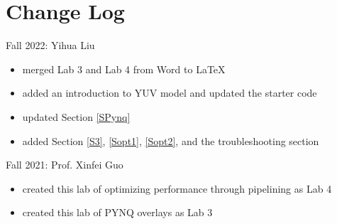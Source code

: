 \documentclass[a4paper,12pt,twoside]{article}
\begin{document}
\section{Change Log}
Fall 2022: Yihua Liu
\begin{itemize}
    \item merged Lab 3 and Lab 4 from Word to LaTeX
    \item added an introduction to YUV model and updated the starter code
    \item updated Section \ref{SPynq}
    \item added Section \ref{S3}, \ref{Sopt1}, \ref{Sopt2}, and the troubleshooting section
\end{itemize}
Fall 2021: Prof. Xinfei Guo
\begin{itemize}
    \item created this lab of optimizing performance through pipelining as Lab 4
    \item created this lab of PYNQ overlays as Lab 3
\end{itemize}

\printbibliography
\end{document}
